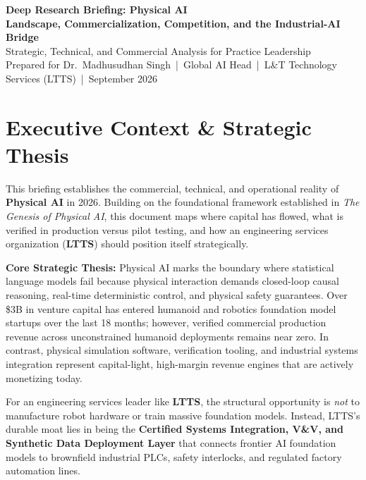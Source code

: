 \documentclass[11pt,a4paper]{article}
\begin{document}
\begin{center}
{\LARGE\bfseries\color{darkprimary} Deep Research Briefing: Physical AI}\\[5pt]
{\large\color{textdark}\textbf{Landscape, Commercialization, Competition, and the Industrial-AI Bridge}}\\[3pt]
{\small\color{textgray} Strategic, Technical, and Commercial Analysis for Practice Leadership}\\[3pt]
{\small\color{textgray} Prepared for Dr.\ Madhusudhan Singh \,|\, Global AI Head \,|\, L\&T Technology Services (LTTS) \,|\, September 2026}
\end{center}

\vspace{0.2cm}

\section*{Executive Context \& Strategic Thesis}
This briefing establishes the commercial, technical, and operational reality of \textbf{Physical AI} in 2026. Building on the foundational framework established in \textit{The Genesis of Physical AI}, this document maps where capital has flowed, what is verified in production versus pilot testing, and how an engineering services organization (\textbf{LTTS}) should position itself strategically.

\textbf{Core Strategic Thesis:} Physical AI marks the boundary where statistical language models fail because physical interaction demands closed-loop causal reasoning, real-time deterministic control, and physical safety guarantees. Over \$3B in venture capital has entered humanoid and robotics foundation model startups over the last 18 months; however, verified commercial production revenue across unconstrained humanoid deployments remains near zero. In contrast, physical simulation software, verification tooling, and industrial systems integration represent capital-light, high-margin revenue engines that are actively monetizing today.

For an engineering services leader like \textbf{LTTS}, the structural opportunity is \textit{not} to manufacture robot hardware or train massive foundation models. Instead, LTTS's durable moat lies in being the \textbf{Certified Systems Integration, V\&V, and Synthetic Data Deployment Layer} that connects frontier AI foundation models to brownfield industrial PLCs, safety interlocks, and regulated factory automation lines.
\end{document}
